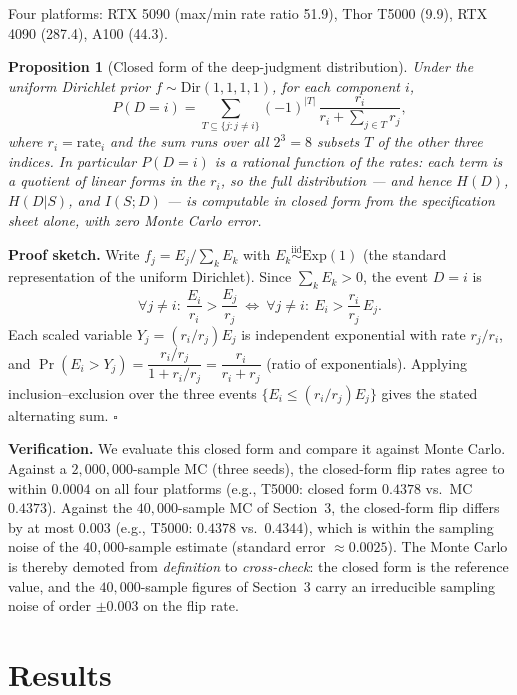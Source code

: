 \documentclass[10pt]{article}
\newtheorem{proposition}{Proposition}
\begin{document}
Four platforms: RTX 5090 (max/min rate ratio 51.9), Thor T5000 (9.9), RTX 4090 (287.4), A100 (44.3).

\begin{proposition}[Closed form of the deep-judgment distribution]\label{prop:closedform}
Under the uniform Dirichlet prior $f\sim\mathrm{Dir}(1,1,1,1)$, for each component $i$,
\[
P(D=i)=\sum_{T\subseteq\{j:j\neq i\}} (-1)^{|T|}\,\frac{r_i}{r_i+\sum_{j\in T} r_j},
\]
where $r_i=\mathrm{rate}_i$ and the sum runs over all $2^{3}=8$ subsets $T$ of the other three indices. In particular $P(D=i)$ is a \emph{rational function of the rates}: each term is a quotient of linear forms in the $r_i$, so the full distribution --- and hence $H(D)$, $H(D|S)$, and $I(S;D)$ --- is computable in closed form from the specification sheet alone, with zero Monte Carlo error.
\end{proposition}

\textbf{Proof sketch.} Write $f_j=E_j/\sum_k E_k$ with $E_k\stackrel{\mathrm{iid}}{\sim}\mathrm{Exp}(1)$ (the standard representation of the uniform Dirichlet). Since $\sum_k E_k>0$, the event $D=i$ is
\[
\forall j\neq i:\ \frac{E_i}{r_i}>\frac{E_j}{r_j}\ \Longleftrightarrow\ \forall j\neq i:\ E_i > \frac{r_i}{r_j}\,E_j .
\]
Each scaled variable $Y_j=(r_i/r_j)E_j$ is independent exponential with rate $r_j/r_i$, and $\Pr(E_i>Y_j)=\dfrac{r_i/r_j}{1+r_i/r_j}=\dfrac{r_i}{r_i+r_j}$ (ratio of exponentials). Applying inclusion--exclusion over the three events $\{E_i\le (r_i/r_j)E_j\}$ gives the stated alternating sum. $\square$

\textbf{Verification.} We evaluate this closed form and compare it against Monte Carlo. Against a $2{,}000{,}000$-sample MC (three seeds), the closed-form flip rates agree to within $0.0004$ on all four platforms (e.g., T5000: closed form $0.4378$ vs.\ MC $0.4373$). Against the $40{,}000$-sample MC of Section~3, the closed-form flip differs by at most $0.003$ (e.g., T5000: $0.4378$ vs.\ $0.4344$), which is within the sampling noise of the $40{,}000$-sample estimate (standard error $\approx 0.0025$). The Monte Carlo is thereby demoted from \emph{definition} to \emph{cross-check}: the closed form is the reference value, and the $40{,}000$-sample figures of Section~3 carry an irreducible sampling noise of order $\pm 0.003$ on the flip rate.

\section{Results}\label{results}
\end{document}
